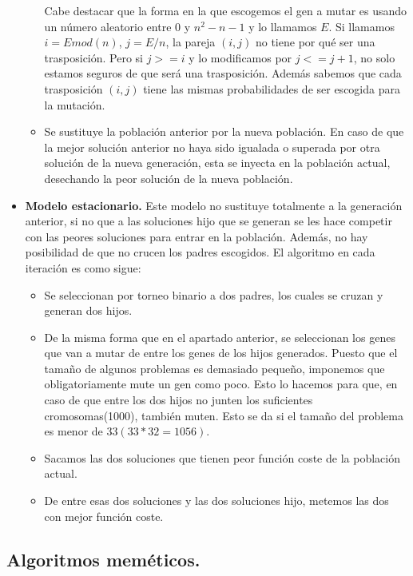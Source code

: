 \begin{itemize}
\begin{itemize}
		Cabe destacar que la forma en la que escogemos el gen a mutar es usando un número aleatorio entre 0 y $n^2-n-1$ y lo llamamos $E$. Si llamamos $i= E mod(n)$, $j=E/n$, la pareja $(i,j)$ no tiene por qué ser una trasposición. Pero si $j >= i$ y lo modificamos por $j<=j+1$, no solo estamos seguros de que será una trasposición. Además sabemos que cada trasposición $(i,j)$ tiene las mismas probabilidades de ser escogida para la mutación.
		
		\item Se sustituye la población anterior por la nueva población. En caso de que la mejor solución anterior no haya sido igualada o superada por otra solución de la nueva generación, esta se inyecta en la población actual, desechando la peor solución de la nueva población.
		
	\end{itemize}
	
	\item \textbf{Modelo estacionario.} Este modelo no sustituye totalmente a la generación anterior, si no que a las soluciones hijo que se generan se les hace competir con las peores soluciones para entrar en la población. Además, no hay posibilidad de que no crucen los padres escogidos. El algoritmo en cada iteración es como sigue:\\
	
	\begin{itemize}
		\item Se seleccionan por torneo binario a dos padres, los cuales se cruzan y generan dos hijos. 
		\item De la misma forma que en el apartado anterior, se seleccionan los genes que van a mutar de entre los genes de los hijos generados. Puesto que el tamaño de algunos problemas es demasiado pequeño, imponemos que obligatoriamente mute un gen como poco. Esto lo hacemos para que, en caso de que entre los dos hijos no junten los suficientes cromosomas(1000), también muten. Esto se da si el tamaño del problema es menor de 33$(33*32=1056)$.
		
		\item Sacamos las dos soluciones que tienen peor función coste de la población actual.
		
		\item De entre esas dos soluciones y las dos soluciones hijo, metemos las dos con mejor función coste.
	\end{itemize}
\end{itemize}

\subsection{Algoritmos meméticos.}

